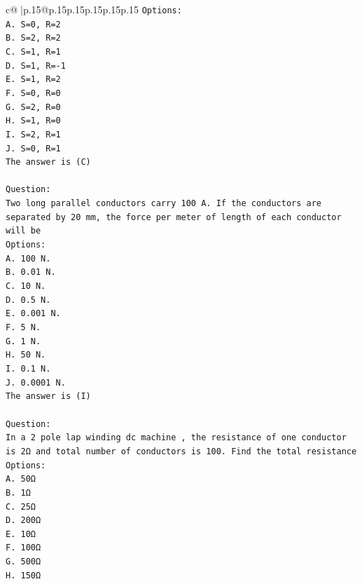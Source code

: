 \documentclass{article}
\begin{document}
{\begin{supertabular}{c@{$\;$}|p{.15\linewidth}@{}p{.15\linewidth}p{.15\linewidth}p{.15\linewidth}p{.15\linewidth}p{.15\linewidth}}
{{{\texttt{Options:} \\
\texttt{A. S=0, R=2} \\
\texttt{B. S=2, R=2} \\
\texttt{C. S=1, R=1} \\
\texttt{D. S=1, R={-}1} \\
\texttt{E. S=1, R=2} \\
\texttt{F. S=0, R=0} \\
\texttt{G. S=2, R=0} \\
\texttt{H. S=1, R=0} \\
\texttt{I. S=2, R=1} \\
\texttt{J. S=0, R=1} \\
\texttt{The answer is (C)} \\
\\ 
\texttt{Question:} \\
\texttt{Two long parallel conductors carry 100 A. If the conductors are separated by 20 mm, the force per meter of length of each conductor will be} \\
\texttt{Options:} \\
\texttt{A. 100 N.} \\
\texttt{B. 0.01 N.} \\
\texttt{C. 10 N.} \\
\texttt{D. 0.5 N.} \\
\texttt{E. 0.001 N.} \\
\texttt{F. 5 N.} \\
\texttt{G. 1 N.} \\
\texttt{H. 50 N.} \\
\texttt{I. 0.1 N.} \\
\texttt{J. 0.0001 N.} \\
\texttt{The answer is (I)} \\
\\ 
\texttt{Question:} \\
\texttt{In a 2 pole lap winding dc machine , the resistance of one conductor is 2Ω and total number of conductors is 100. Find the total resistance} \\
\texttt{Options:} \\
\texttt{A. 50Ω} \\
\texttt{B. 1Ω} \\
\texttt{C. 25Ω} \\
\texttt{D. 200Ω} \\
\texttt{E. 10Ω} \\
\texttt{F. 100Ω} \\
\texttt{G. 500Ω} \\
\texttt{H. 150Ω} \\
}}}
\end{supertabular}}
\end{document}
